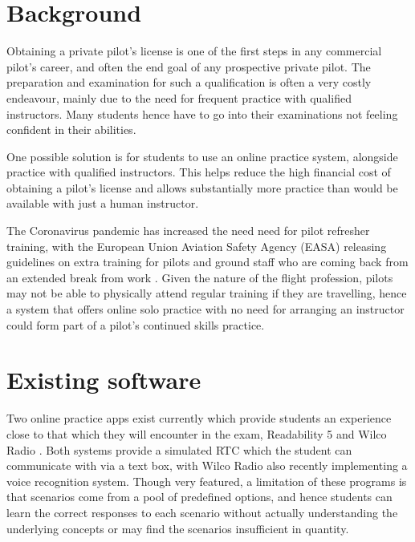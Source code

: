 \section{Background}
Obtaining a private pilot's license is one of the first steps in any commercial pilot's career, and often the end goal of any prospective private pilot.
The preparation and examination for such a qualification is often a very costly endeavour, mainly due to the need for frequent practice with qualified instructors.
Many students hence have to go into their examinations not feeling confident in their abilities.

One possible solution is for students to use an online practice system, alongside practice with qualified instructors. This helps reduce the high financial cost of obtaining a pilot's license and allows substantially more practice than would be available with just a human instructor.

The Coronavirus pandemic has increased the need need for pilot refresher training, with the European Union Aviation Safety Agency (EASA) releasing guidelines on extra training for pilots and ground staff who are coming back from an extended break from work \cite{EASA-training-post-covid}. Given the nature of the flight profession, pilots may not be able to physically attend regular training if they are travelling, hence a system that offers online solo practice with no need for arranging an instructor could form part of a pilot's continued skills practice.
\section{Existing software}
Two online practice apps exist currently which provide students an experience close to that which they will encounter in the exam, Readability 5 \cite{readability5} and Wilco Radio \cite{wilcoradio}.
Both systems provide a simulated RTC which the student can communicate with via a text box, with Wilco Radio also recently implementing a voice recognition system.
Though very featured, a limitation of these programs is that scenarios come from a pool of predefined options, and hence students can learn the correct responses to each scenario without actually understanding the underlying concepts or may find the scenarios insufficient in quantity.